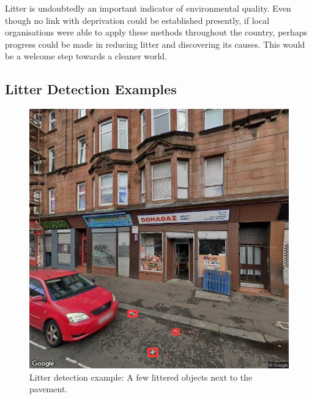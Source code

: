\documentclass{thesis}
\begin{document}
Litter is undoubtedly an important indicator of environmental quality\cite{household-survey-2019}. Even though no link with deprivation could be established presently, if local organisations were able to apply these methods throughout the country, perhaps progress could be made in reducing litter and discovering its causes. This would be a welcome step towards a cleaner world.


\begin{appendices}

\chapter{Litter Detection Examples}

\begin{figure}[h!]
    \centering
    \includegraphics[scale=0.375]{images/good-three.jpg}
    \caption{Litter detection example: A few littered objects next to the pavement.}
\end{figure}


\end{appendices}
\end{document}

